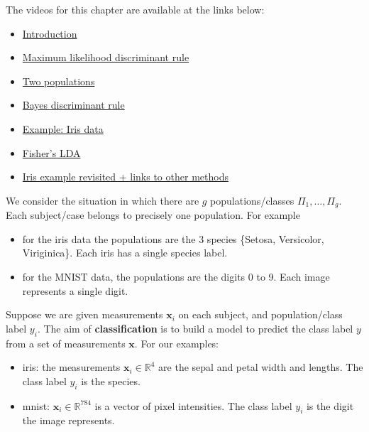 \documentclass[
]{book}
\providecommand{\tightlist}{%
  \setlength{\itemsep}{0pt}\setlength{\parskip}{0pt}}
\theoremstyle{definition}
\theoremstyle{definition}
\theoremstyle{definition}
\theoremstyle{definition}
\theoremstyle{remark}
\begin{document}
The videos for this chapter are available at the links below:

\begin{itemize}
\tightlist
\item
  \href{https://mediaspace.nottingham.ac.uk/media/LDAA+Introduction/1_v282qg5y}{Introduction}
\item
  \href{https://mediaspace.nottingham.ac.uk/media/LDAA+Maximum+likelihood+discriminant+rule/1_zqo5q14s}{Maximum likelihood discriminant rule}
\item
  \href{https://mediaspace.nottingham.ac.uk/media/LDAA+2+populations/1_v273b9lp}{Two populations}
\item
  \href{https://mediaspace.nottingham.ac.uk/media/LDAA+Bayes+discriminant+rule+\%28with+sound\%29/1_b2uxl6cv}{Bayes discriminant rule}
\item
  \href{https://mediaspace.nottingham.ac.uk/media/LDAA+Iris+example/1_cb9grj25}{Example: Iris data}
\item
  \href{https://mediaspace.nottingham.ac.uk/media/LDAA+Fisher\%27s+discriminant+rule+\%28with+sound\%29/1_p68ggh8a}{Fisher's LDA}\\
\item
  \href{https://mediaspace.nottingham.ac.uk/media/LDAA+Fisher\%27s+LDA+on+the+iris+data+\%2B+links+with+ML+LDA/1_vsc58wzc}{Iris example revisited + links to other methods}
\end{itemize}

We consider the situation in which there are \(g\) populations/classes \(\Pi_1, \ldots , \Pi_g\). Each subject/case belongs to precisely one population. For example

\begin{itemize}
\item
  for the iris data the populations are the 3 species \{Setosa, Versicolor, Viriginica\}. Each iris has a single species label.
\item
  for the MNIST data, the populations are the digits 0 to 9. Each image represents a single digit.
\end{itemize}

Suppose we are given measurements \(\mathbf x_i\) on each subject, and population/class label \(y_i\).
The aim of \textbf{classification} is to build a model to predict the class label \(y\) from a set of measurements \(\mathbf x\). For our examples:

\begin{itemize}
\item
  iris: the measurements \(\mathbf x_i\in \mathbb{R}^{4}\) are the sepal and petal width and lengths. The class label \(y_i\) is the species.
\item
  mnist: \(\mathbf x_i\in \mathbb{R}^{784}\) is a vector of pixel intensities. The class label \(y_i\) is the digit the image represents.
\end{itemize}
\end{document}
